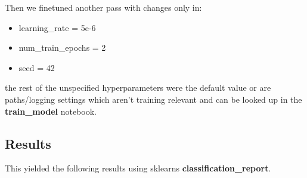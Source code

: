 \documentclass[11pt,a4paper]{article}
\begin{document}
Then we finetuned another pass with changes only in:

\begin{itemize}
    \setlength{\itemsep}{0.5pt}
    \item learning\_rate = 5e-6
    \item num\_train\_epochs = 2
    \item seed = 42
\end{itemize}
the rest of the unspecified hyperparameters were the default value or are paths/logging settings which aren't training
relevant and can be looked up in the \textbf{train\_model} notebook.

\subsection{Results}
This yielded the following results using sklearns \textbf{classification\_report}.
\begin{table}
\caption{Classification report for our finetuned model without external features}


\label{tab:model}
\end{table}
\end{document}
